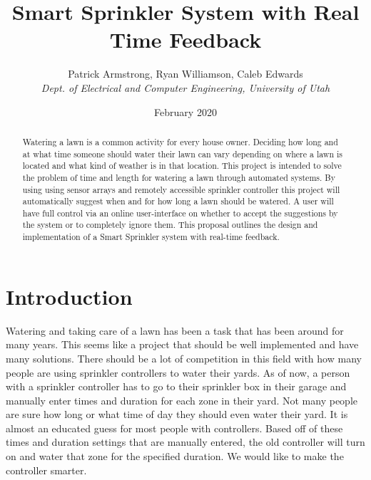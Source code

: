 \documentclass[letterpaper, 10 pt, conference]{ieeeconf}  %
\title{Smart Sprinkler System with Real Time Feedback}
\author{Patrick Armstrong, Ryan Williamson, Caleb Edwards\\
    \textit{Dept. of Electrical and Computer Engineering, University of Utah}
}
\date{February 2020}
\begin{document}
\maketitle

\begin{abstract}
Watering a lawn is a common activity for every house owner. Deciding how long and at what time someone should water their lawn can vary depending on where a lawn is located and what kind of weather is in that location. This project is intended to solve the problem of time and length for watering a lawn through automated systems. By using using sensor arrays and remotely accessible sprinkler controller this project will automatically suggest when and for how long a lawn should be watered. A user will have full control via an online user-interface on whether to accept the suggestions by the system or to completely ignore them. This proposal outlines the design and implementation of a Smart Sprinkler system with real-time feedback.


\end{abstract}

\section{Introduction}
Watering and taking care of a lawn has been a task that has been around for many years. This seems like a project that should be well implemented and have many solutions. There should be a lot of competition in this field with how many people are using sprinkler controllers to water their yards. As of now, a person with a sprinkler controller has to go to their sprinkler box in their garage and manually enter times and duration for each zone in their yard. Not many people are sure how long or what time of day they should even water their yard. It is almost an educated guess for most people with controllers. Based off of these times and duration settings that are manually entered, the old controller will turn on and water that zone for the specified duration. We would like to make the controller smarter.
\end{document}
